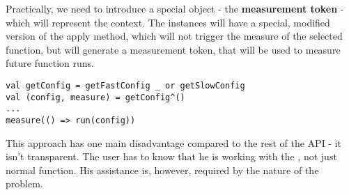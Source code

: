 Practically, we need to introduce a special object - the \textbf{measurement token} - which will represent the context. The  instances will have a special, modified version of the apply method, which will not trigger the measure of the selected function, but will generate a measurement token, that will be used to measure future function runs.

\lstset{style=Scala}
\begin{lstlisting}
val getConfig = getFastConfig _ or getSlowConfig
val (config, measure) = getConfig^()
...
measure(() => run(config))
\end{lstlisting}

This approach has one main disadvantage compared to the rest of the API - it isn't transparent. The user has to know that he is working with the , not just normal function. His assistance is, however, required by the nature of the problem.


